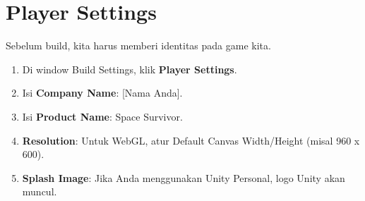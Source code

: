 
\section{Player Settings}

Sebelum build, kita harus memberi identitas pada game kita.

\begin{enumerate}
    \item Di window Build Settings, klik \textbf{Player Settings}.
    \item Isi \textbf{Company Name}: [Nama Anda].
    \item Isi \textbf{Product Name}: Space Survivor.
    \item \textbf{Resolution}: Untuk WebGL, atur Default Canvas Width/Height (misal 960 x 600).
    \item \textbf{Splash Image}: Jika Anda menggunakan Unity Personal, logo Unity akan muncul.
\end{enumerate}
